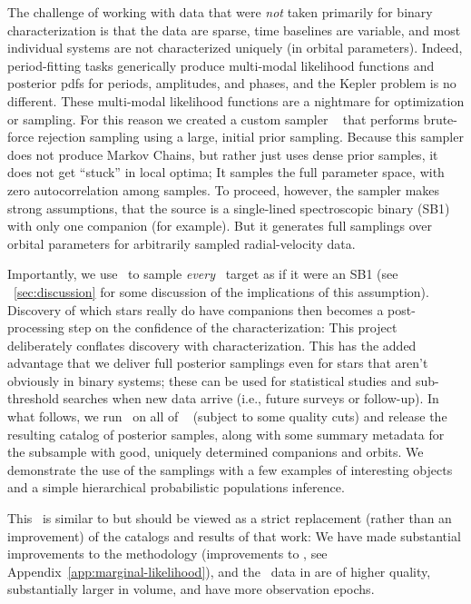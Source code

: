 \documentclass[modern]{aastex63}
\begin{document}
The challenge of working with data that were \emph{not} taken primarily for
binary characterization is that the data are sparse, time baselines are
variable, and most individual systems are not characterized uniquely (in orbital
parameters).
Indeed, period-fitting tasks generically produce multi-modal likelihood
functions and posterior pdfs for periods, amplitudes, and phases, and the Kepler
problem is no different.
These multi-modal likelihood functions are a nightmare for optimization or
sampling.
For this reason we created a custom sampler \thejoker\ \citep{thejoker} that
performs brute-force rejection sampling using a large, initial prior sampling.
Because this sampler does not produce Markov Chains, but rather just uses dense
prior samples, it does not get ``stuck'' in local optima; It samples the full
parameter space, with zero autocorrelation among samples.
To proceed, however, the sampler makes strong assumptions, that the source is a
single-lined spectroscopic binary (SB1) with only one companion (for example).
But it generates full samplings over orbital parameters for arbitrarily sampled
radial-velocity data.

Importantly, we use \thejoker\ to sample \emph{every} \apogee\ target as if it
were an SB1 (see \sectionname~\ref{sec:discussion} for some discussion of the
implications of this assumption).
Discovery of which stars really do have companions then becomes a
post-processing step on the confidence of the characterization: This project
deliberately conflates discovery with characterization.
This has the added advantage that we deliver full posterior samplings even for
stars that aren't obviously in binary systems; these can be used for statistical
studies and sub-threshold searches when new data arrive (i.e., future surveys or
follow-up).
In what follows, we run \thejoker\ on all of \apogee\  (subject to some
quality cuts) and release the resulting catalog of posterior samples, along with
some summary metadata for the subsample with good, uniquely determined
companions and orbits.
We demonstrate the use of the samplings with a few examples of interesting
objects and a simple hierarchical probabilistic populations inference.

This \documentname\ is similar to \cite{Price-Whelan:2018} but should be viewed
as a strict replacement (rather than an improvement) of the catalogs and results
of that work: We have made substantial improvements to the methodology
(improvements to \thejoker, see Appendix~\ref{app:marginal-likelihood}), and the
\apogee\ data in  are of higher quality, substantially larger in
volume, and have more observation epochs.
\end{document}
